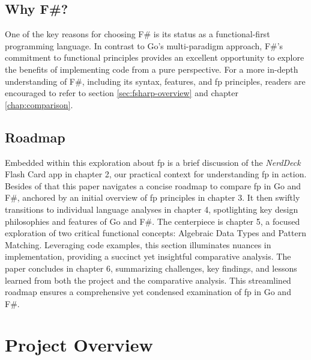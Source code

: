     \section{Why F\#?}\label{sec:whyfsharp}
    One of the key reasons for choosing F\# is its status as a functional-first programming language. In contrast to Go's multi-paradigm approach, F\#'s commitment to functional principles provides an excellent opportunity to explore the benefits of implementing code from a pure perspective.
    For a more in-depth understanding of F\#, including its syntax, features, and \ac{fp} principles, readers are encouraged to refer to section \ref{sec:fsharp-overview} and chapter \ref{chap:comparison}.

    \section{Roadmap}\label{sec:roadmap}
    Embedded within this exploration about \ac{fp} is a brief discussion of the \textit{NerdDeck} Flash Card \ac{app} in chapter 2, our practical context for understanding \ac{fp} in action. Besides of that this paper navigates a concise roadmap to compare \ac{fp} in Go and F\#, anchored by an initial overview of \ac{fp} principles in chapter 3. It then swiftly transitions to individual language analyses in chapter 4, spotlighting key design philosophies and features of Go and F\#. The centerpiece is chapter 5, a focused exploration of two critical functional concepts: Algebraic Data Types and Pattern Matching. Leveraging code examples, this section illuminates nuances in implementation, providing a succinct yet insightful comparative analysis. The paper concludes in chapter 6, summarizing challenges, key findings, and lessons learned from both the project and the comparative analysis. This streamlined roadmap ensures a comprehensive yet condensed examination of \ac{fp} in Go and F\#.

\chapter{Project Overview}\label{chap:project-overview}
